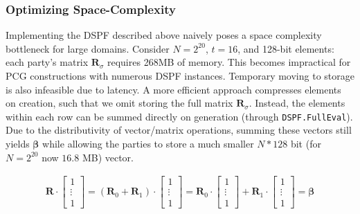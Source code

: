 \subsubsection{Optimizing Space-Complexity}
Implementing the DSPF described above naively poses a space complexity bottleneck for large domains. Consider  $N=2^{20}$, $t=16$, and 128-bit elements: each party's matrix $\boldsymbol{R}_\sigma$ requires 268MB of memory. This becomes impractical for PCG constructions with numerous DSPF instances.  Temporary moving to storage is also infeasible due to latency. A more efficient approach compresses elements on creation, such that we omit storing the full matrix $\boldsymbol{R}_\sigma$. Instead, the elements within each row can be summed directly on generation (through \texttt{DSPF.FullEval}). Due to the distributivity of vector/matrix operations, summing these vectors still yields $\boldsymbol{\beta}$ while allowing the parties to store a much smaller $N*128$ bit (for $N=2^{20}$ now $16.8$ MB) vector.

\begin{equation}
\begin{aligned}
\label{eq:optimizedSpaceCompexity}
\boldsymbol{R} \cdot \begin{bmatrix} 1 \\ \vdots \\ 1 \end{bmatrix} = (\boldsymbol{R}_0 + \boldsymbol{R}_1 ) \cdot\begin{bmatrix} 1 \\ \vdots \\ 1 \end{bmatrix} = \boldsymbol{R}_0 \cdot\begin{bmatrix} 1 \\ \vdots \\ 1 \end{bmatrix} + \boldsymbol{R}_1 \cdot\begin{bmatrix} 1 \\ \vdots \\ 1 \end{bmatrix} = \boldsymbol{\beta} 
\end{aligned}
\end{equation}

